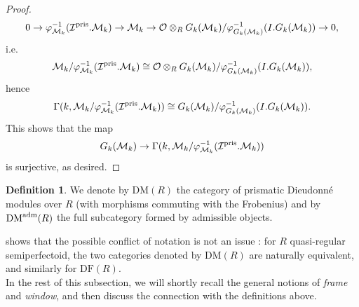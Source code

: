 \documentclass{amsart}
\theoremstyle{plain}
\theoremstyle{definition}
\newtheorem{definition}[theorem]{Definition}
\newcommand{\DM}{\mathrm{DM}}
\newcommand{\DF}{\mathrm{DF}}
\newcommand{\red}[1]{{\color{black} #1}}
\newcommand{\olive}[1]{{\color{black}#1}}
\begin{document}
{\begin{proof}
$$
0  \to \varphi_{\mathcal{M}_k}^{-1}(\mathcal{I}^{\rm pris}.\mathcal{M}_k) \to \mathcal{M}_k \to \mathcal{O} \otimes_R G_k(\mathcal{M}_k)/\varphi_{G_k(\mathcal{M}_k)}^{-1}(I.G_k(\mathcal{M}_k)) \to 0,
$$
i.e. 
$$
\mathcal{M}_k/\varphi_{\mathcal{M}_k}^{-1}(\mathcal{I}^{\rm pris}.\mathcal{M}_k) \cong \mathcal{O} \otimes_R G_k(\mathcal{M}_k)/\varphi_{G_k(\mathcal{M}_k)}^{-1}(I.G_k(\mathcal{M}_k)),
$$
hence 
$$
\Gamma(k,\mathcal{M}_k/\varphi_{\mathcal{M}_k}^{-1}(\mathcal{I}^{\rm pris}.\mathcal{M}_k)) \cong G_k(\mathcal{M}_k)/\varphi_{G_k(\mathcal{M}_k)}^{-1}(I.G_k(\mathcal{M}_k)).
$$
This shows that the map 
$$
G_k(\mathcal{M}_k) \to \Gamma(k,\mathcal{M}_k/\varphi_{\mathcal{M}_k}^{-1}(\mathcal{I}^{\rm pris}.\mathcal{M}_k))
$$ 
is surjective, as desired.
 \end{proof}
}

\begin{definition}
  \label{sec:abstr-divid-prism-definition-categories-of-divided-dieudonne-modules} We denote by $\mathrm{DM}(R)$ the category of prismatic Dieudonn\'e modules over $R$ (with morphisms commuting with the Frobenius) and by $\mathrm{DM}^{\rm adm}(R)$ the full subcategory formed by admissible objects. 
\end{definition}
 shows that the possible conflict of notation is not an issue : for $R$ quasi-regular semiperfectoid, the two categories denoted by $\mathrm{DM}(R)$ are naturally equivalent, and similarly for $\DF(R)$.
\\






In the rest of this subsection, we will shortly recall the general notions of \textit{frame} and \textit{window}, and then discuss the connection with the definitions above.   
\end{document}

